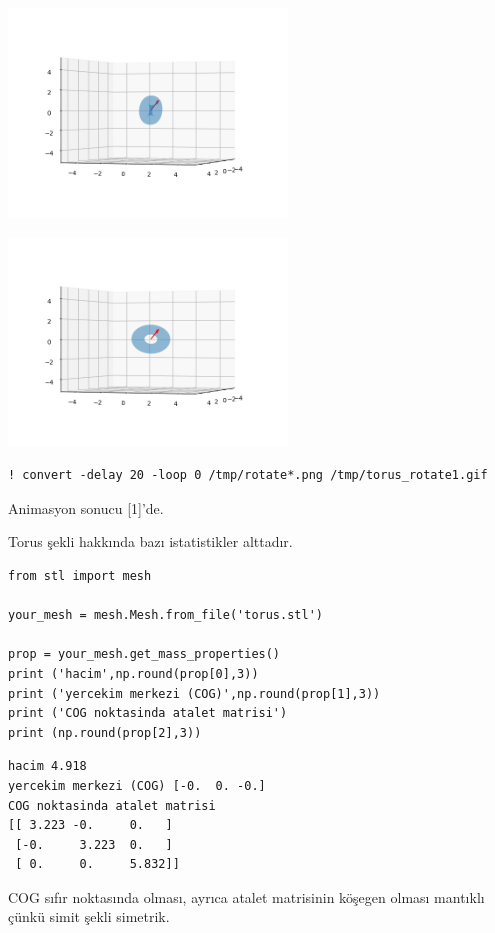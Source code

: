 \documentclass[12pt,fleqn]{article}\usepackage{../../common}
\begin{document}
\includegraphics[width=20em]{sim1/rotate_08.png}

\includegraphics[width=20em]{sim1/rotate_14.png}

\begin{verbatim}
! convert -delay 20 -loop 0 /tmp/rotate*.png /tmp/torus_rotate1.gif
\end{verbatim}

Animasyon sonucu [1]'de.

Torus şekli hakkında bazı istatistikler alttadır.

\begin{verbatim}
from stl import mesh

your_mesh = mesh.Mesh.from_file('torus.stl')

prop = your_mesh.get_mass_properties()
print ('hacim',np.round(prop[0],3))
print ('yercekim merkezi (COG)',np.round(prop[1],3))
print ('COG noktasinda atalet matrisi')
print (np.round(prop[2],3))
\end{verbatim}

\begin{verbatim}
hacim 4.918
yercekim merkezi (COG) [-0.  0. -0.]
COG noktasinda atalet matrisi
[[ 3.223 -0.     0.   ]
 [-0.     3.223  0.   ]
 [ 0.     0.     5.832]]
\end{verbatim}

COG sıfır noktasında olması, ayrıca atalet matrisinin köşegen olması mantıklı
çünkü simit şekli simetrik.
\end{document}

